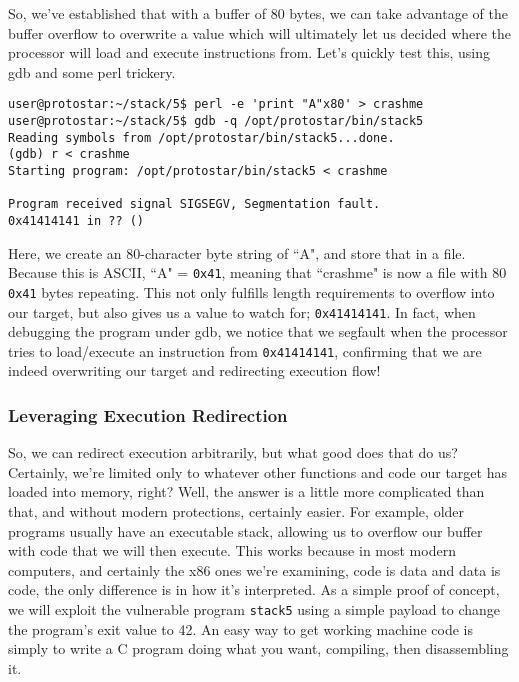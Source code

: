 So, we've established that with a buffer of 80 bytes, we can take advantage of the buffer overflow
to overwrite a value which will ultimately let us decided where the processor will load and
execute instructions from. Let's quickly test this, using gdb and some perl trickery.

\begin{lstlisting}
user@protostar:~/stack/5$ perl -e 'print "A"x80' > crashme
user@protostar:~/stack/5$ gdb -q /opt/protostar/bin/stack5
Reading symbols from /opt/protostar/bin/stack5...done.
(gdb) r < crashme
Starting program: /opt/protostar/bin/stack5 < crashme

Program received signal SIGSEGV, Segmentation fault.
0x41414141 in ?? ()
\end{lstlisting}
Here, we create an 80-character byte string of ``A", and store that in a file. Because this is ASCII,
``A" = \texttt{0x41}, meaning that ``crashme" is now a file with 80 \texttt{0x41} bytes repeating. This
not only fulfills length requirements to overflow into our target, but also gives us a value to
watch for; \texttt{0x41414141}. In fact, when debugging the program under gdb, we notice that
we segfault when the processor tries to load/execute an instruction from \texttt{0x41414141}, confirming
that we are indeed overwriting our target and redirecting execution flow!

\subsubsection{Leveraging Execution Redirection}
So, we can redirect execution arbitrarily, but what good does that do us? Certainly, we're limited only to
whatever other functions and code our target has loaded into memory, right? Well, the answer is a little
more complicated than that, and without modern protections, certainly easier. For example, older
programs usually have an executable stack, allowing us to overflow our buffer with code that we will
then execute. This works because in most modern computers, and certainly the x86 ones we're examining,
code is data and data is code, the only difference is in how it's interpreted. 
As a simple proof of concept, we will exploit the vulnerable program \texttt{stack5}
using a simple payload to change the program's exit value to 42. An easy way to get working machine
code is simply to write a C program doing what you want, compiling, then disassembling it.



